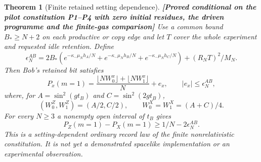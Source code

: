\documentclass[11pt,a4paper]{article}
\newtheorem{theorem}{Theorem}[section]
\theoremstyle{definition}
\theoremstyle{remark}\newtheorem{remark}[theorem]{Remark}
\newcommand{\status}[1]{\textbf{[#1]}\quad}
\begin{document}
\begin{theorem}[Finite retained setting dependence]\label{pil:signal}
\status{Proved conditional on the pilot constitution P1--P4 with zero initial residues, the driven programme and the finite-gas comparison}
Use a common bound $B_*\ge N+2$ on each productive or copy edge and let $T$ cover the whole experiment and requested idle retention. Define
\begin{equation}\label{pil:signalerror}
 \epsilon_N^{AB}=2B_*\left(e^{-\kappa_-\mu_Nh_A/N}
             +e^{-\kappa_-\mu_Nh_B/N}
             +e^{-\kappa_-\mu_Nh_C/N}\right)+(R_NT)^2/M_N.
\end{equation}
Then Bob's retained bit satisfies
\begin{equation}\label{pil:signallaw}
 P_x(m=1)=\frac{\lfloor NW_0^x\rfloor+\lfloor NW_1^x\rfloor}{N}+e_x,
 \qquad |e_x|\le\epsilon_N^{AB},
\end{equation}
where, for $A=\sin^2(gt_B)$ and $C=\sin^2(2gt_B)$,
\[
 (W_0^Z,W_1^Z)=(A/2,C/2),\qquad W_0^X=W_1^X=(A+C)/4.
\]
For every $N\ge3$ a nonempty open interval of $t_B$ gives
\begin{equation}\label{pil:signalgap}
 P_Z(m=1)-P_X(m=1)\ge1/N-2\epsilon_N^{AB}.
\end{equation}
This is a setting-dependent ordinary record law of the finite nonrelativistic constitution. It is not yet a demonstrated spacelike implementation or an experimental observation.
\end{theorem}
\end{document}

